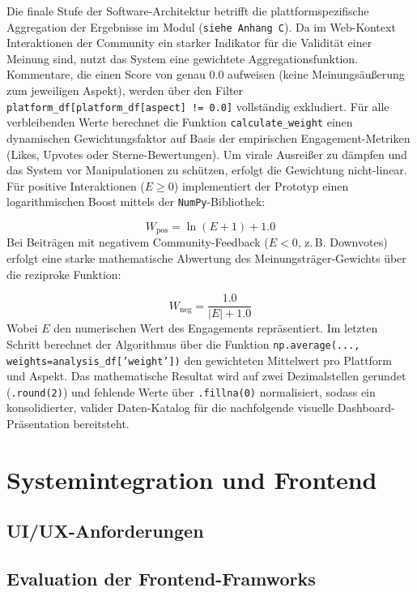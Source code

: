 \documentclass[12pt]{article}
\begin{document}
Die finale Stufe der Software-Architektur betrifft die plattformspezifische Aggregation der Ergebnisse im Modul (\texttt{siehe Anhang C}). Da im Web-Kontext Interaktionen der Community ein starker Indikator für die Validität einer Meinung sind, nutzt das System eine gewichtete Aggregationsfunktion. Kommentare, die einen Score von genau $0.0$ aufweisen (keine Meinungsäußerung zum jeweiligen Aspekt), werden über den Filter \texttt{platform\_df[platform\_df[aspect] != 0.0]} vollständig exkludiert. Für alle verbleibenden Werte berechnet die Funktion \texttt{calculate\_weight} einen dynamischen Gewichtungsfaktor auf Basis der empirischen Engagement-Metriken (Likes, Upvotes oder Sterne-Bewertungen). Um virale Ausreißer zu dämpfen und das System vor Manipulationen zu schützen, erfolgt die Gewichtung nicht-linear. Für positive Interaktionen ($E \ge 0$) implementiert der Prototyp einen logarithmischen Boost mittels der \texttt{NumPy}-Bibliothek:

\begin{equation}
W_{\text{pos}} = \ln(E + 1) + 1.0
\end{equation}
Bei Beiträgen mit negativem Community-Feedback ($E < 0$, z.\,B. Downvotes) erfolgt eine starke mathematische Abwertung des Meinungsträger-Gewichts über die reziproke Funktion:

\begin{equation}
W_{\text{neg}} = \frac{1.0}{|E| + 1.0}
\end{equation}
Wobei $E$ den numerischen Wert des Engagements repräsentiert. Im letzten Schritt berechnet der Algorithmus über die Funktion \texttt{np.average(..., weights=analysis\_df['weight'])} den gewichteten Mittelwert pro Plattform und Aspekt. Das mathematische Resultat wird auf zwei Dezimalstellen gerundet (\texttt{.round(2)}) und fehlende Werte über \texttt{.fillna(0)} normalisiert, sodass ein konsolidierter, valider Daten-Katalog für die nachfolgende visuelle Dashboard-Präsentation bereitsteht.
\section{Systemintegration und Frontend}
\subsection{UI/UX-Anforderungen}
\subsection{Evaluation der Frontend-Framworks}
\end{document}
